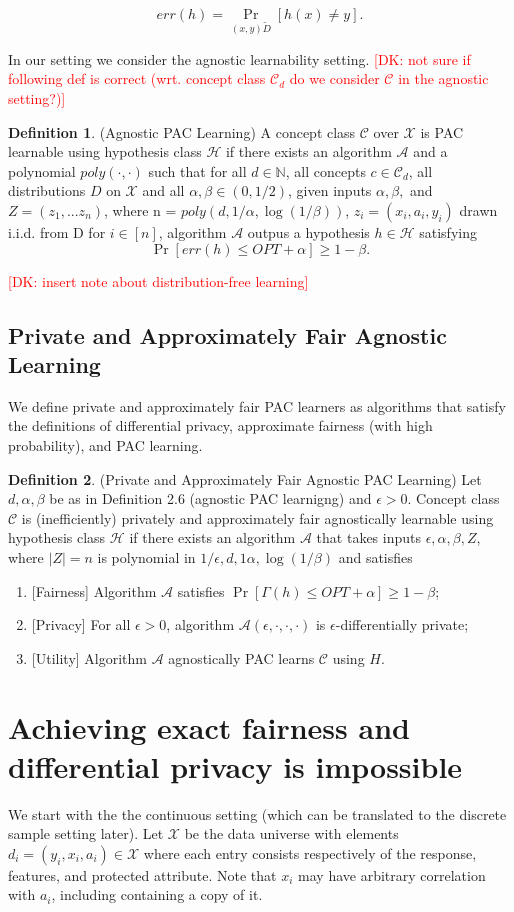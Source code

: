 \documentclass[format = sigconf]{acmart}
\newcommand{\dk}[1]{\textcolor{red}{[DK: #1]}}
\newcommand{\A}{\mathcal{A}}
\renewcommand{\H}{\mathcal{H}}
\newcommand{\C}{\mathcal{C}}
\newcommand{\X}{\mathcal{X}}
\newcommand{\1}{\mathbbm{1}}
\newcommand{\eps}{\epsilon}
\theoremstyle{definition}
\newtheorem{defn}{Definition}[section]
\begin{document}
$$err(h) = \Pr_{(x,y) \tilde D}[h(x) \neq y].$$

In our setting we consider the agnostic learnability setting.
\dk {not sure if following def is correct (wrt. concept class $\C_d$ do we consider $\C$ in the agnostic setting?)}
\begin{defn}
	(Agnostic PAC Learning) A concept class $\C$ over $\X$ is PAC learnable using hypothesis class $\H$ if there exists an algorithm $\A$ and a polynomial $poly(\cdot,\cdot)$ such that for all $d \in \mathbb{N}$, all concepts $c \in \mathcal{C}_d$, all distributions $D$ on $\X$ and all $\alpha,\beta \in (0,1/2)$, given inputs $\alpha,\beta,$ and $Z = (z_1, ... z_n)$, where n = $poly(d, 1/\alpha, \log(1/\beta))$, $z_i = (x_i, a_i, y_i)$ drawn i.i.d. from D for $i \in [n]$, algorithm $\A$ outpus a hypothesis $h \in \H$ satisfying
	$$\Pr[err(h) \leq OPT + \alpha] \geq 1-\beta.$$

\end{defn}
\dk {insert note about distribution-free learning}
\subsection{Private and Approximately Fair Agnostic Learning}
We define private and approximately fair PAC learners as algorithms that satisfy the definitions of differential privacy, approximate fairness (with high probability), and PAC learning.
\begin{defn}
	(Private and Approximately Fair Agnostic PAC Learning)
	Let $d, \alpha, \beta$ be as in Definition 2.6 (agnostic PAC learnigng) and $\eps > 0$. Concept class $\C$ is (inefficiently) privately and approximately fair agnostically learnable using hypothesis class $\H$ if there exists an algorithm $\A$ that takes inputs $\eps, \alpha, \beta, Z$, where $|Z|=n$ is polynomial in $1/\eps, d, 1\alpha, \log(1/\beta)$ and satisfies
	\begin{enumerate}
		\item {[}Fairness{]} Algorithm $\A$ satisfies $\Pr[\Gamma(h) \leq OPT + \alpha] \geq 1-\beta$;
		\item {[}Privacy{]} For all $\eps>0$, algorithm $\A(\eps, \cdot, \cdot, \cdot)$ is $\eps$-differentially private;
		\item {[}Utility{]} Algorithm $\A$ agnostically PAC learns $\C$ using $H$.
	\end{enumerate}
\end{defn}

\section{Achieving exact fairness and differential privacy is impossible}
We start with the the continuous setting (which can be translated to the discrete sample setting later). Let $\mathcal{X}$ be the data universe with elements $d_i = (y_i,x_i,a_i) \in \mathcal{X}$ where each entry consists respectively of the response, features, and protected attribute. Note that $x_i$ may have arbitrary correlation with $a_i$, including containing a copy of it.
\end{document}
